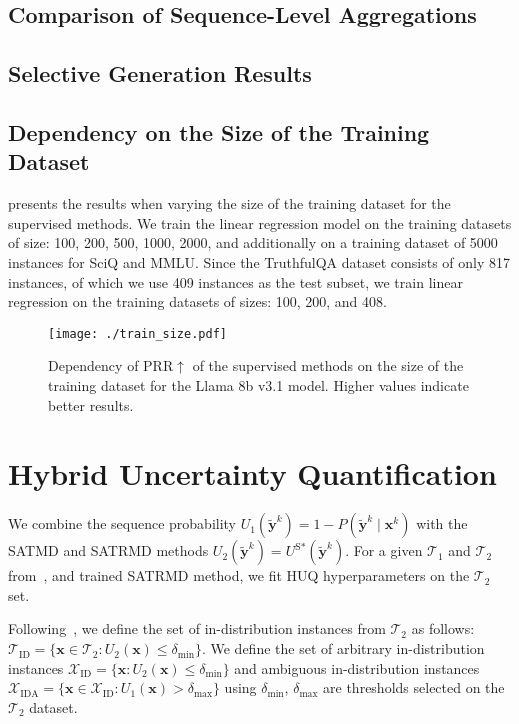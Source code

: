 \documentclass[11pt]{article}
\newcommand{\xv}{\mathbf{x}}
\newcommand{\yv}{\mathbf{y}}
\newcommand{\TC}{\mathcal{T}}
\newcommand{\XSet}{\mathcal{X}}
\begin{document}
\subsection{Comparison of Sequence-Level Aggregations}
\label{sec:aggregation}
  

\subsection{Selective Generation Results}
\label{sec:overall_results}
  

\subsection{Dependency on the Size of the Training Dataset}
\label{sec:trainsize_results}
   presents the results when varying the size of the training dataset for the supervised methods. We train the linear regression model on the training datasets of size: 100, 200, 500, 1000, 2000, and additionally on a training dataset of 5000 instances for SciQ and MMLU. Since the TruthfulQA dataset consists of only 817 instances, of which we use 409 instances as the test subset, we train linear regression on the training datasets of sizes: 100, 200, and 408. 

  \begin{figure*}[ht!]
    \centering
    \texttt{[image: ./train\_size.pdf]}
    \caption{
    Dependency of PRR$\uparrow$ of the supervised methods on the size of the training dataset for the Llama 8b v3.1 model. Higher values indicate better results.
    }
    \label{fig:tmd_trainsize}
  \end{figure*}

\section{Hybrid Uncertainty Quantification}
\label{sec:huq}
  We combine the sequence probability $U_{\text{1}}(\tilde{\yv}^k) = 1 - P(\tilde{\yv}^k \mid \xv^k)$ with the SATMD and SATRMD methods $U_{\text{2}}(\tilde{\yv}^k) = U^{\text{S*}}(\tilde{\yv}^k)$. For a given $\TC_1$ and $\TC_2$ from~, and trained SATRMD method, we fit HUQ hyperparameters on the $\TC_2$ set.

  Following~\citet{vazhentsev-etal-2023-hybrid}, we define the set of in-distribution instances from $\TC_2$ as follows: $\TC_{\text{ID}} = \{\xv \in \TC_2\colon U_{\text{2}}(\xv) \leq \delta_{\min}\}$. We define the set of arbitrary in-distribution instances $\XSet_{\text{ID}} = \{\xv\colon U_{\text{2}}(\xv) \leq \delta_{\min}\}$ and ambiguous in-distribution instances $\XSet_{\text{IDA}} = \{\xv {\in \XSet_{\text{ID}}}\colon U_{\text{1}}(\xv) > \delta_{\max}\}$ using $\delta_{\min}$, $\delta_{\max}$ are thresholds selected on the $\TC_2$ dataset. 
\end{document}
